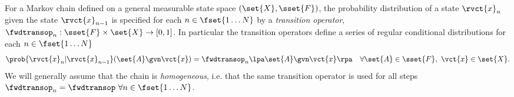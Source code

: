 For a Markov chain defined on a general measurable state space $(\set{X}, \sset{F})$, the probability distribution of a state $\rvct{x}_n$ given the state $\rvct{x}_{n-1}$ is specified for each $n \in \fset{1\dots N}$ by a \emph{transition operator}, $\fwdtransop_n : \sset{F} \times \set{X} \to [0, 1]$. In particular the transition operators define a series of regular conditional distributions for each $n \in \fset{1 \dots N}$
\begin{equation}\label{eq:markov-kernel-definition}
  \prob{\rvct{x}_n|\rvct{x}_{n-1}}(\set{A} \gvn \vct{x}) =
  \fwdtransop_n\lpa\set{A} \gvn \vct{x}\rpa
  \quad 
  \forall \set{A} \in \sset{F},~
  \vct{x} \in \set{X}.
\end{equation}
We will generally assume that the chain is \emph{homogeneous}, i.e. that the same transition operator is used for all steps $\fwdtransop_n = \fwdtransop ~\forall n\in\fset{1 \dots N}$. 


